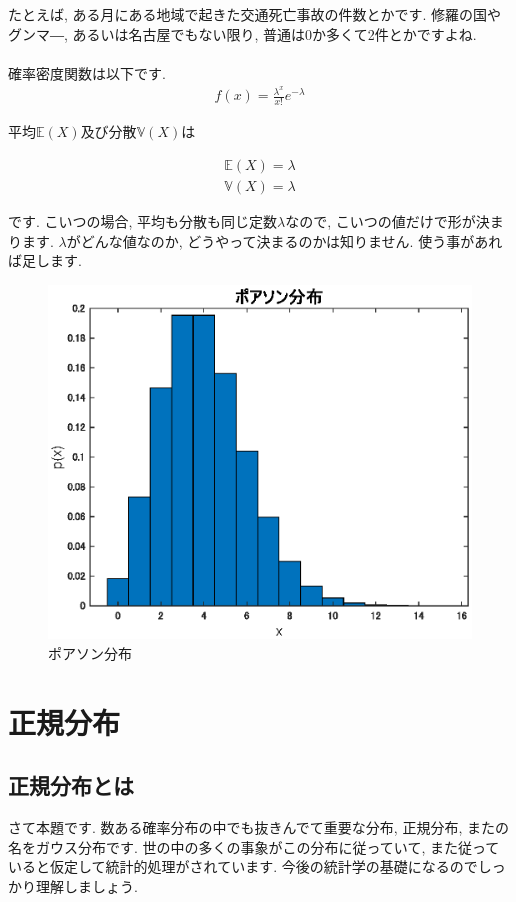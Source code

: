 \documentclass[11pt,a4paper]{ujreport} 	%
\begin{document}
たとえば, ある月にある地域で起きた交通死亡事故の件数とかです. 修羅の国やグンマ―, あるいは名古屋でもない限り, 普通は0か多くて2件とかですよね.\\
\\

確率密度関数は以下です.
\begin{align}
f(x) = \frac{\lambda^x}{x!}e^{-\lambda}
\end{align}

平均$\mathbb{E}(X)$及び分散$\mathbb{V}(X)$は

\begin{align}
\mathbb{E}(X) = \lambda\\
\mathbb{V}(X) = \lambda
\end{align}

です. こいつの場合, 平均も分散も同じ定数$\lambda$なので, こいつの値だけで形が決まります. $\lambda$がどんな値なのか, どうやって決まるのかは知りません. 使う事があれば足します.\\

\begin{figure}[H]
\label{im:poisson}
  \centering
  \includegraphics[width=15cm]{../figures/poisson.eps}
  \caption{ポアソン分布}
\end{figure}

\section{正規分布}
\subsection{正規分布とは}
さて本題です. 数ある確率分布の中でも抜きんでて重要な分布, 正規分布, またの名をガウス分布です. 世の中の多くの事象がこの分布に従っていて, また従っていると仮定して統計的処理がされています. 今後の統計学の基礎になるのでしっかり理解しましょう.\\
\\
\end{document}
